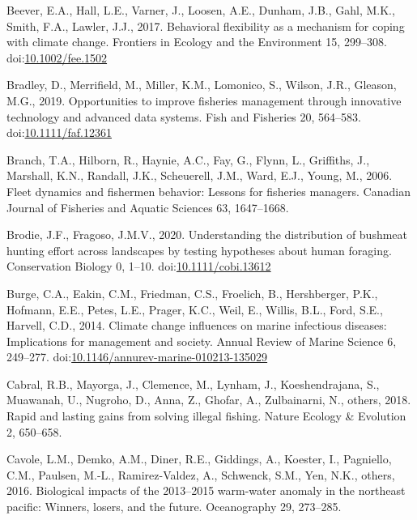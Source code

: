 \documentclass[]{elsarticle} %
\begin{document}
\leavevmode\hypertarget{ref-Beever2017}{}%
Beever, E.A., Hall, L.E., Varner, J., Loosen, A.E., Dunham, J.B., Gahl,
M.K., Smith, F.A., Lawler, J.J., 2017. Behavioral flexibility as a
mechanism for coping with climate change. Frontiers in Ecology and the
Environment 15, 299--308.
doi:\href{https://doi.org/10.1002/fee.1502}{10.1002/fee.1502}

\leavevmode\hypertarget{ref-Bradley2019}{}%
Bradley, D., Merrifield, M., Miller, K.M., Lomonico, S., Wilson, J.R.,
Gleason, M.G., 2019. Opportunities to improve fisheries management
through innovative technology and advanced data systems. Fish and
Fisheries 20, 564--583.
doi:\href{https://doi.org/10.1111/faf.12361}{10.1111/faf.12361}

\leavevmode\hypertarget{ref-Branch2006}{}%
Branch, T.A., Hilborn, R., Haynie, A.C., Fay, G., Flynn, L., Griffiths,
J., Marshall, K.N., Randall, J.K., Scheuerell, J.M., Ward, E.J., Young,
M., 2006. Fleet dynamics and fishermen behavior: Lessons for fisheries
managers. Canadian Journal of Fisheries and Aquatic Sciences 63,
1647--1668.

\leavevmode\hypertarget{ref-Brodie2020}{}%
Brodie, J.F., Fragoso, J.M.V., 2020. Understanding the distribution of
bushmeat hunting effort across landscapes by testing hypotheses about
human foraging. Conservation Biology 0, 1--10.
doi:\href{https://doi.org/10.1111/cobi.13612}{10.1111/cobi.13612}

\leavevmode\hypertarget{ref-Burge2014}{}%
Burge, C.A., Eakin, C.M., Friedman, C.S., Froelich, B., Hershberger,
P.K., Hofmann, E.E., Petes, L.E., Prager, K.C., Weil, E., Willis, B.L.,
Ford, S.E., Harvell, C.D., 2014. Climate change influences on marine
infectious diseases: Implications for management and society. Annual
Review of Marine Science 6, 249--277.
doi:\href{https://doi.org/10.1146/annurev-marine-010213-135029}{10.1146/annurev-marine-010213-135029}

\leavevmode\hypertarget{ref-Cabral2018}{}%
Cabral, R.B., Mayorga, J., Clemence, M., Lynham, J., Koeshendrajana, S.,
Muawanah, U., Nugroho, D., Anna, Z., Ghofar, A., Zulbainarni, N.,
others, 2018. Rapid and lasting gains from solving illegal fishing.
Nature Ecology \& Evolution 2, 650--658.

\leavevmode\hypertarget{ref-Cavole2016}{}%
Cavole, L.M., Demko, A.M., Diner, R.E., Giddings, A., Koester, I.,
Pagniello, C.M., Paulsen, M.-L., Ramirez-Valdez, A., Schwenck, S.M.,
Yen, N.K., others, 2016. Biological impacts of the 2013--2015 warm-water
anomaly in the northeast pacific: Winners, losers, and the future.
Oceanography 29, 273--285.
\end{document}
